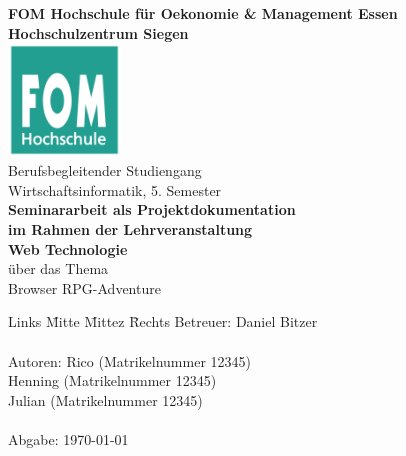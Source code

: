 \documentclass[12pt,oneside,titlepage]{scrartcl}
\newcommand{\myAutor}{Rico  (Matrikelnummer 12345)\\ \> \> \> 
Henning   (Matrikelnummer 12345)\\ \> \> \> 
Julian  (Matrikelnummer 12345)} %
\newcommand{\myAdresse}{Stra\ss e 123 \\ \> \> \> 57xxx Siegerland} %
\newcommand{\myTitel}{Browser RPG-Adventure } %
\newcommand{\myBetreuer}{Daniel Bitzer} %
\newcommand{\myLehrveranstaltung}{Web Technologie} %
\newcommand{\myMatrikelNr}{123456} %
\newcommand{\myAbgabeDatum}{\today} %
\newcommand{\mySemesterZahl}{5} %
\newcommand{\myHochschulName}{FOM Hochschule für Oekonomie \& Management Essen} %
\newcommand{\myHochschulStandort}{Siegen} %
\newcommand{\myStudiengang}{Wirtschaftsinformatik} %
\newcommand{\myThesisArt}{Seminararbeit als Projektdokumentation} %
\newcommand{\myAkademischerGrad}{Bachelor of Science (B. Sc.)} %
\begin{document}

\renewcommand{\refname}{Literaturverzeichnis}		%

\begin{titlepage} %
	\begin{center}
		\textbf{\myHochschulName}\\
		\textbf{Hochschulzentrum \myHochschulStandort}\\
		\vspace{1.5cm}
			\includegraphics[width=3cm]{media/fomLogo} \\
		\vspace{1.5cm}
		Berufsbegleitender Studiengang\\
		\myStudiengang, \mySemesterZahl. Semester\\
		\vspace{2cm}
		\textbf{\myThesisArt}\\
		\textbf{im Rahmen der Lehrveranstaltung}\\
		\textbf{\myLehrveranstaltung}\\
		\vspace{2cm}
		über das Thema\\
		\Large{\myTitel}\\
		\vspace{0.2cm}
	\end{center}
	\normalsize
	\vfill
	\begin{tabbing}
		Links \= Mitte \=Mittez \= Rechts\kill
		Betreuer: \> \> \>\myBetreuer\\
		\> \> \\
		Autoren: \> \> \> \myAutor\\
		\> \> \>  \\
		Abgabe: \> \> \> \myAbgabeDatum
	\end{tabbing}
\end{titlepage}
\end{document}
